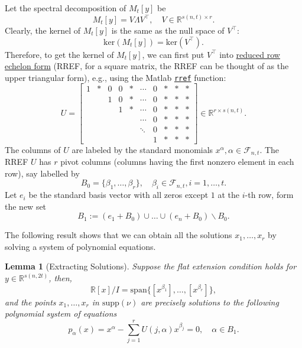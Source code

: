 \documentclass[
]{book}
\newtheorem{lemma}{Lemma}[chapter]
\theoremstyle{definition}
\theoremstyle{definition}
\theoremstyle{definition}
\theoremstyle{definition}
\theoremstyle{remark}
\begin{document}
Let the spectral decomposition of \(M_t[y]\) be
\[
M_t[y] = V \Lambda V^\top, \quad V \in \mathbb{R}^{s(n,t) \times r}.
\]
Clearly, the kernel of \(M_t[y]\) is the same as the null space of \(V^\top\):
\[
\mathrm{ker}(M_t[y]) = \mathrm{ker}(V^\top).
\]
Therefore, to get the kernel of \(M_t[y]\), we can first put \(V^\top\) into \href{https://en.wikipedia.org/wiki/Row_echelon_form\#:~:text=row\%20echelon\%20form-,A\%20matrix\%20is\%20in\%20row\%20echelon\%20form\%20if,entry\%20of\%20every\%20row\%20above.}{reduced row echelon form} (RREF, for a square matrix, the RREF can be thought of as the upper triangular form), e.g., using the Matlab \href{https://www.mathworks.com/help/matlab/ref/rref.html}{\texttt{rref}} function:
\[
U = \begin{bmatrix}
1 & * & 0 & 0 & * & \cdots & 0 & * & * & * \\
 & & 1 & 0 & * & \cdots & 0 & * & * & * \\
  & & & 1 & * & \cdots & 0 & * & * & * \\
    & & &  &  & \cdots & 0 & * & * & * \\
      & & &  &  & \ddots & 0 & * & * & * \\
      & & &  &  &  & 1 & * & * & * 
\end{bmatrix} \in \mathbb{R}^{r \times s(n,t)}.
\]
The columns of \(U\) are labeled by the standard monomials \(x^{\alpha}, \alpha \in \mathcal{F}_{n,t}\). The RREF \(U\) has \(r\) pivot columns (columns having the first nonzero element in each row), say labelled by
\[
B_0 = \{ \beta_1, \dots, \beta_r \}, \quad \beta_i \in \mathcal{F}_{n,t}, i=1,\dots,t.
\]
Let \(e_i\) be the standard basis vector with all zeros except \(1\) at the \(i\)-th row, form the new set
\[
B_1 := (e_1 + B_0) \cup \dots \cup (e_n + B_0) \backslash B_0.
\]

The following result shows that we can obtain all the solutions \(x_1,\dots,x_r\) by solving a system of polynomial equations.

\begin{lemma}[Extracting Solutions]
\protect\hypertarget{lem:ExtractingSolutions}{}\label{lem:ExtractingSolutions}Suppose the flat extension condition holds for \(y \in \mathbb{R}^{s(n,2t)}\), then,
\[
\mathbb{R}[x]/I = \mathrm{span}\{ [x^{\beta_1}], \dots, [x^{\beta_r}] \},
\]
and the points \(x_1,\dots,x_r\) in \(\mathrm{supp}(\nu)\) are precisely solutions to the following polynomial system of equations
\begin{equation}
p_{\alpha}(x) = x^{\alpha} - \sum_{j=1}^r U(j,\alpha) x^{\beta_j} = 0, \quad \alpha \in B_1.
\label{eq:extract-solution-polynomial-system}
\end{equation}
\end{lemma}
\end{document}
